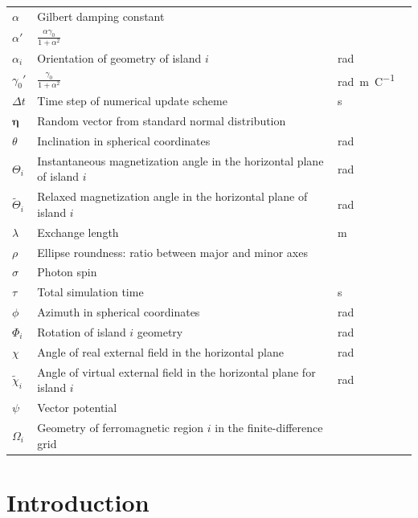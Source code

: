 \documentclass[11pt,a4paper,english]{article}
\renewcommand{\vec}[1]{\boldsymbol{#1}}
\begin{document}
\begin{longtable}{llll}
\midrule
$\alpha$ & Gilbert damping constant &  \\
$\alpha'$ & $\frac{\alpha \gamma_0}{1+\alpha^2}$ &  \\
$\alpha_i$ & Orientation of geometry of island $i$ & \si{\radian} \\
$\gamma_0'$ & $\frac{\gamma_0}{1+\alpha^2}$ & \si{\radian\metre\per\coulomb} \\
$\Delta t$ & Time step of numerical update scheme & \si{\second} \\
$\vec{\eta}$ & Random vector from standard normal distribution &  \\
$\theta$ & Inclination in spherical coordinates & \si{\radian} \\
$\Theta_i$ & Instantaneous magnetization angle in the horizontal plane of island $i$ & \si{\radian} \\
$\widetilde{\Theta}_i$ & Relaxed magnetization angle in the horizontal plane of island $i$ & \si{\radian} \\
$\lambda$ & Exchange length & \si{\metre} \\
$\rho$ & Ellipse roundness: ratio between major and minor axes &  \\
$\sigma$ & Photon spin & \si{} \\
$\tau$ & Total simulation time & \si{\second} \\
$\phi$ & Azimuth in spherical coordinates & \si{\radian} \\
$\Phi_i$ & Rotation of island $i$ geometry & \si{\radian} \\
$\chi$ & Angle of real external field in the horizontal plane & \si{\radian} \\
$\widetilde{\chi}_i$ & Angle of virtual external field in the horizontal plane for island $i$ & \si{\radian} \\
$\psi$ & Vector potential & \\
$\Omega_i$ & Geometry of ferromagnetic region $i$ in the finite-difference grid & \\
\bottomrule
\end{longtable}



\cleardoublepage
{}
\section{Introduction}
\end{document}
